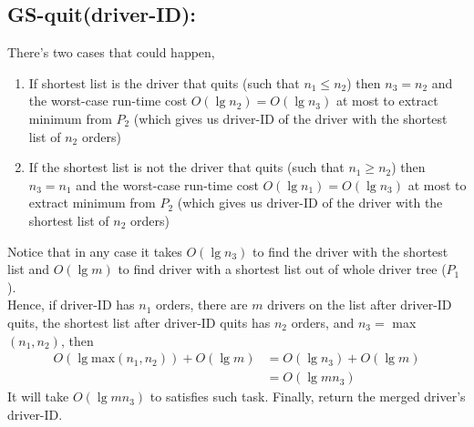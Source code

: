 \documentclass{article}
\begin{document}
\subsection*{GS-quit(driver-ID):} 
There's two cases that could happen,
\begin{enumerate}
    \item If shortest list is the driver that quits (such that $n_1 \leq n_2$) then $n_3 = n_2$ and the worst-case run-time cost $O(\lg n_2) = O(\lg n_3)$ at most to extract minimum from $P_2$ (which gives us driver-ID of the driver with the shortest list of $n_2$ orders)
    \item If the shortest list is not the driver that quits (such that $n_1 \geq n_2$) then $n_3 = n_1$ and the worst-case run-time cost $O(\lg n_1) = O(\lg n_3)$ at most to extract minimum from $P_2$ (which gives us driver-ID of the driver with the shortest list of $n_2$ orders)
\end{enumerate}
Notice that in any case it takes $O(\lg n_3)$ to find the driver with the shortest list and $O(\lg m)$ to find driver with a shortest list out of whole driver tree ($P_1$).\\
Hence, if driver-ID has $n_1$ orders, there are $m$ drivers on the list after driver-ID quits, the shortest list after driver-ID quits has $n_2$ orders, and $n_3 = $ max$(n_1,n_2)$, then
\begin{align*}
    O(\lg \text{max}(n_1,n_2)) + O(\lg m) &= O(\lg n_3) + O(\lg m) \\
    &= O(\lg mn_3)
\end{align*}
It will take $O(\lg mn_3)$ to satisfies such task. Finally, return the merged driver's driver-ID.
\end{document}
